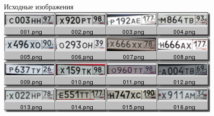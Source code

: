 \newcommand{\inimage}[2]{
  \begin{minipage}{#1}
    \vcenter{\texttt{[image: \#2]}}
  \end{minipage}
}


% 

\begin{frame}{Исходные изображения}
  \includegraphics[width=\columnwidth]{content/out_sr1.png}
\end{frame}

